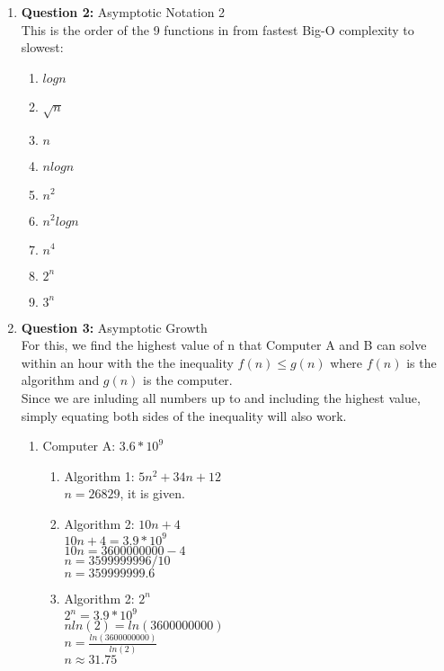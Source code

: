 \documentclass[11pt]{article}
\begin{document}
\begin{enumerate}
\item
\textbf{Question 2:} Asymptotic Notation 2 \\
This is the order of the 9 functions in from fastest Big-O complexity to slowest: 
\begin{enumerate}[label=(\alph*)]
    \item
    $logn$
    \item
    $\sqrt{n}$
    \item 
    $n$
    \item 
    $nlogn$
    \item 
    $n^2$
    \item 
    $n^2logn$
    \item 
    $n^4$
    \item
    $2^n$
    \item 
    $3^n$
\end{enumerate}
\item
\textbf{Question 3:} Asymptotic Growth  \\
For this, we find the highest value of n that Computer A and B can solve within an hour with the the inequality $f(n) \leq g(n)$ where $f(n)$ is the algorithm and $g(n)$ is the computer.\\
Since we are inluding all numbers up to and including the highest value, simply equating both sides of the inequality will also work.
\begin{enumerate}[label=(\alph*)]
    \item
    Computer A: $3.6 * 10^9$
    \begin{enumerate}[label=(\alph*)]
        \item 
        Algorithm 1: $5n^2+34n+12$ \\
        $n = 26829$, it is given.
        \item 
        Algorithm 2: $10n+4$ \\
        $10n + 4 = 3.9 * 10^9$\\
        $10n = 3600000000 - 4$ \\
        $n = 3599999996/10$ \\
        $n = 359999999.6$ 
        \item 
        Algorithm 2: $2^n$\\
        $2^n = 3.9 * 10^9$\\
        $nln(2) = ln(3600000000)$\\
        $n = \frac{ln(3600000000)}{ln(2)}$\\
        $n \approx  31.75$
    \end{enumerate}

\end{enumerate}
\end{enumerate}
\end{document}
